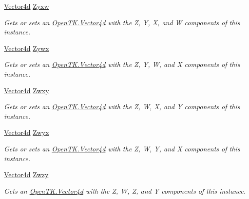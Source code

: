 \begin{DoxyCompactItemize}
\hyperlink{struct_open_t_k_1_1_vector4d}{Vector4d} \hyperlink{struct_open_t_k_1_1_vector4d_a38de2947c9afdbaaee67e21e94f22775}{Zyxw}
\begin{DoxyCompactList}\small\item\em Gets or sets an \hyperlink{struct_open_t_k_1_1_vector4d}{Open\-T\-K.\-Vector4d} with the Z, Y, X, and W components of this instance. \end{DoxyCompactList}\item 
\hyperlink{struct_open_t_k_1_1_vector4d}{Vector4d} \hyperlink{struct_open_t_k_1_1_vector4d_a93e87ff99458410f8bd8e1953094f56b}{Zywx}
\begin{DoxyCompactList}\small\item\em Gets or sets an \hyperlink{struct_open_t_k_1_1_vector4d}{Open\-T\-K.\-Vector4d} with the Z, Y, W, and X components of this instance. \end{DoxyCompactList}\item 
\hyperlink{struct_open_t_k_1_1_vector4d}{Vector4d} \hyperlink{struct_open_t_k_1_1_vector4d_ac67b4699c19bddbe5f02f876cb5ed8ae}{Zwxy}
\begin{DoxyCompactList}\small\item\em Gets or sets an \hyperlink{struct_open_t_k_1_1_vector4d}{Open\-T\-K.\-Vector4d} with the Z, W, X, and Y components of this instance. \end{DoxyCompactList}\item 
\hyperlink{struct_open_t_k_1_1_vector4d}{Vector4d} \hyperlink{struct_open_t_k_1_1_vector4d_aa87578ae549f0135d03ceacb4c4de657}{Zwyx}
\begin{DoxyCompactList}\small\item\em Gets or sets an \hyperlink{struct_open_t_k_1_1_vector4d}{Open\-T\-K.\-Vector4d} with the Z, W, Y, and X components of this instance. \end{DoxyCompactList}\item 
\hyperlink{struct_open_t_k_1_1_vector4d}{Vector4d} \hyperlink{struct_open_t_k_1_1_vector4d_a7b494871928e7257d512760ea9106254}{Zwzy}
\begin{DoxyCompactList}\small\item\em Gets an \hyperlink{struct_open_t_k_1_1_vector4d}{Open\-T\-K.\-Vector4d} with the Z, W, Z, and Y components of this instance. \end{DoxyCompactList}\item 

\end{DoxyCompactItemize}
